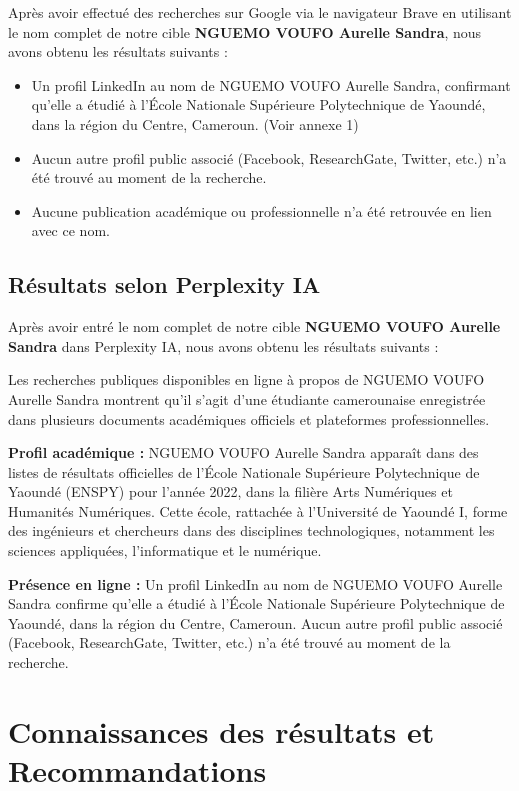\documentclass[12pt, a4paper]{article}
\begin{document}
Après avoir effectué des recherches sur Google via le navigateur Brave en utilisant le nom complet de notre cible \textbf{NGUEMO VOUFO Aurelle Sandra}, nous avons obtenu les résultats suivants :

\begin{itemize}
	\item Un profil LinkedIn au nom de NGUEMO VOUFO Aurelle Sandra, confirmant qu'elle a étudié à l'École Nationale Supérieure Polytechnique de Yaoundé, dans la région du Centre, Cameroun. (Voir annexe 1)
	\item Aucun autre profil public associé (Facebook, ResearchGate, Twitter, etc.) n'a été trouvé au moment de la recherche.
	\item Aucune publication académique ou professionnelle n'a été retrouvée en lien avec ce nom.
\end{itemize}

\subsection{Résultats selon Perplexity IA}

Après avoir entré le nom complet de notre cible \textbf{NGUEMO VOUFO Aurelle Sandra} dans Perplexity IA, nous avons obtenu les résultats suivants :

Les recherches publiques disponibles en ligne à propos de NGUEMO VOUFO Aurelle Sandra montrent qu'il s'agit d'une étudiante camerounaise enregistrée dans plusieurs documents académiques officiels et plateformes professionnelles.

\textbf{Profil académique :}
NGUEMO VOUFO Aurelle Sandra apparaît dans des listes de résultats officielles de l'École Nationale Supérieure Polytechnique de Yaoundé (ENSPY) pour l'année 2022, dans la filière Arts Numériques et Humanités Numériques. Cette école, rattachée à l'Université de Yaoundé I, forme des ingénieurs et chercheurs dans des disciplines technologiques, notamment les sciences appliquées, l'informatique et le numérique.

\textbf{Présence en ligne :}
Un profil LinkedIn au nom de NGUEMO VOUFO Aurelle Sandra confirme qu'elle a étudié à l'École Nationale Supérieure Polytechnique de Yaoundé, dans la région du Centre, Cameroun. Aucun autre profil public associé (Facebook, ResearchGate, Twitter, etc.) n'a été trouvé au moment de la recherche.

\section{Connaissances des résultats et Recommandations}
\end{document}
